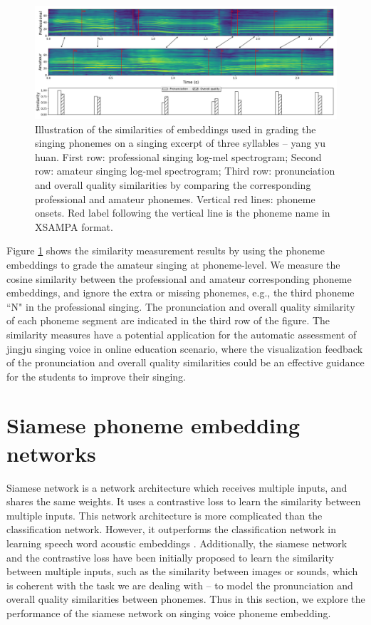\begin{landscape}
\mbox{}\vfill
\begin{figure}[ht!]
    \centering
    \includegraphics[width=1.5\textwidth]{figs/ch7/yang_yu_huan.png}
    \caption{Illustration of the similarities of embeddings used in grading the singing phonemes on a singing excerpt of three syllables -- yang yu huan. First row: professional singing log-mel spectrogram; Second row: amateur singing log-mel spectrogram; Third row: pronunciation and overall quality similarities by comparing the corresponding professional and amateur phonemes. Vertical red lines: phoneme onsets. Red label following the vertical line is the phoneme name in XSAMPA format.}
    \label{fig:ch7:illustration_embedding}
\end{figure}
\vfill
\end{landscape}

Figure \ref{fig:ch7:illustration_embedding} shows the similarity measurement results by using the phoneme embeddings to grade the amateur singing at phoneme-level. We measure the cosine similarity between the professional and amateur corresponding phoneme embeddings, and ignore the extra or missing phonemes, e.g., the third phoneme ``N" in the professional singing. The pronunciation and overall quality similarity of each phoneme segment are indicated in the third row of the figure. The similarity measures have a potential application for the automatic assessment of jingju singing voice in online education scenario, where the visualization feedback of the pronunciation and overall quality similarities could be an effective guidance for the students to improve their singing.

\section{Siamese phoneme embedding networks}

Siamese network is a network architecture which receives multiple inputs, and shares the same weights. It uses a contrastive loss to learn the similarity between multiple inputs. This network architecture is more complicated than the classification network. However, it outperforms the classification network in learning speech word acoustic embeddings \cite{Settle2016a}. Additionally, the siamese network and the contrastive loss have been initially proposed to learn the similarity between multiple inputs, such as the similarity between images or sounds, which is coherent with the task we are dealing with -- to model the pronunciation and overall quality similarities between phonemes. Thus in this section, we explore the performance of the siamese network on singing voice phoneme embedding. 


